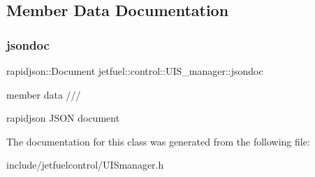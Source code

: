 \subsection{Member Data Documentation}
\mbox{\label{classjetfuel_1_1control_1_1UIS__manager_a83099ccbf9449bf3a3a27d7c7b9b1ff5}} 
\subsubsection{\texorpdfstring{jsondoc}{jsondoc}}
{\footnotesize\ttfamily rapidjson\+::\+Document jetfuel\+::control\+::\+U\+I\+S\+\_\+manager\+::jsondoc\hspace{0.3cm}{\ttfamily [protected]}}



member data /// 

rapidjson J\+S\+ON document 

The documentation for this class was generated from the following file\+:\begin{DoxyCompactItemize}
\item 
include/jetfuelcontrol/U\+I\+Smanager.\+h\end{DoxyCompactItemize}
